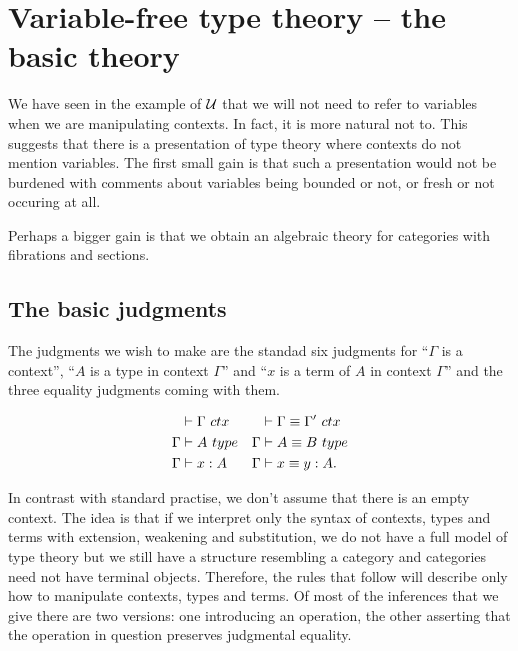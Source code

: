 \section{Variable-free type theory -- the basic theory}
We have seen in the example of $\mathcal{U}$ that we will not need to refer to variables
when we are manipulating contexts. In fact, it is more natural not to.
This suggests that there is a presentation
of type theory where contexts do not mention variables. The first small gain is that such a presentation
would not be burdened with comments about variables being bounded or not, or fresh or
not occuring at all.

Perhaps a bigger gain is that we obtain an algebraic theory for categories with
fibrations and sections. 

\subsection{The basic judgments}
The judgments we wish to make are the standad six judgments for ``$\Gamma$ is a context'', ``$A$ is
a type in context $\Gamma$'' and ``$x$ is a term of $A$ in context $\Gamma$'' and the three equality
judgments coming with them.

\begin{align*}
\jctx*{\Gamma} & \jctxeq*{\Gamma}{\Gamma'}\\
\jtype*{\Gamma}{A} & \jtypeeq*{\Gamma}{A}{B}\\
\jterm*{\Gamma}{A}{x} & \jtermeq*{\Gamma}{A}{x}{y}.
\end{align*}

In contrast with standard practise, we don't assume that there is an empty context. The idea is that
if we interpret only the syntax of contexts, types and terms with extension, weakening and
substitution, we do not have a full model of type theory but we still have a 
structure resembling a category and categories need not have terminal objects. Therefore,
the rules that follow will describe only how to manipulate contexts, types and terms.
Of most of the inferences that we give there are two versions: one introducing an operation, the other asserting that the operation in question preserves judgmental equality. 

